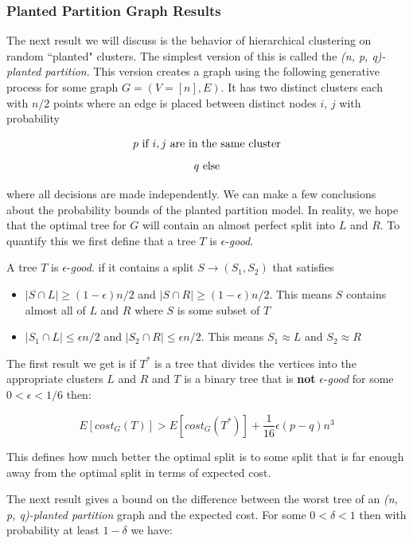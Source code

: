 \subsubsection{Planted Partition Graph Results}

The next result we will discuss is the behavior of hierarchical clustering on random ``planted" clusters. The simplest version of this is called the \textit{(n, p, q)-planted partition}. This version creates a graph using the following generative process for some graph $G = (V = [n], E)$. It has two distinct clusters each with $n/2$ points where an edge is placed between distinct nodes $i$, $j$ with probability

$$p \hbox{ if } i, j \hbox{ are in the same cluster}$$
$$q \hbox{ else}$$

where all decisions are made independently. We can make a few conclusions about the probability bounds of the planted partition model. In reality, we hope that the optimal tree for $G$ will contain an almost perfect split into $L$ and $R$. To quantify this we first define that a tree $T$ is $\epsilon$-\textit{good}. 


\begin{definition}
A tree $T$ is $\epsilon$-\textit{good}. if it contains a split $S \rightarrow (S_1, S_2)$ that satisfies
\begin{itemize}
  \item $|S \cap L| \geq (1 - \epsilon) n/2$ and $|S \cap R| \geq (1 - \epsilon) n/2$. This means $S$ contains almost all of $L$ and $R$ where $S$ is some subset of $T$
  \item $|S_1 \cap L| \leq \epsilon n/2$ and $|S_2 \cap R| \leq \epsilon n/2$. This means $S_1 \approx L$ and $S_2 \approx R$
\end{itemize}
\end{definition}

The first result we get is if $T^*$ is a tree that divides the vertices into the appropriate clusters $L$ and $R$ and $T$ is a binary tree that is \textbf{not} $\epsilon$-\textit{good} for some $0 < \epsilon < 1/6$ then:

$$E[cost_G(T)] > E[cost_G(T^*)] + \frac{1}{16} \epsilon (p - q) n^3$$

This defines how much better the optimal split is to some split that is far enough away from the optimal split in terms of expected cost. 

The next result gives a bound on the difference between the worst tree of an \textit{(n, p, q)-planted partition} graph and the expected cost. For some $0 < \delta < 1$ then with probability at least $1 - \delta$ we have:

